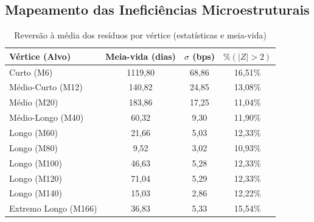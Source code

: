 \documentclass[fleqn]{rbfin}
\begin{document}
\subsection{Mapeamento das Ineficiências Microestruturais}
\begin{table}[H]
\centering
\caption{Reversão à média dos resíduos por vértice (estatísticas e meia-vida)}
\label{tab:reversao_media}
\begin{tabular}{lccc}
\toprule
\textbf{Vértice (Alvo)} & \textbf{Meia-vida (dias)} & \textbf{$\sigma$ (bps)} & \textbf{$\% (|Z| > 2)$} \\ 
\midrule
Curto (M6)              & 1119,80                   & 68,86                   & 16,51\%                 \\
Médio-Curto (M12)       & 140,82                    & 24,85                   & 13,08\%                 \\
Médio (M20)             & 183,86                    & 17,25                   & 11,04\%                 \\
Médio-Longo (M40)       & 60,32                     & 9,30                    & 11,90\%                 \\
Longo (M60)             & 21,66                     & 5,03                    & 12,33\%                 \\
Longo (M80)             & 9,52                      & 3,02                    & 10,93\%                 \\
Longo (M100)            & 46,63                     & 5,28                    & 12,33\%                 \\
Longo (M120)            & 71,04                     & 5,29                    & 12,33\%                 \\
Longo (M140)            & 15,03                     & 2,86                    & 12,22\%                 \\
Extremo Longo (M166)    & 36,83                     & 5,33                    & 15,54\%                 \\ 
\bottomrule
\end{tabular}
\end{table}
\end{document}
